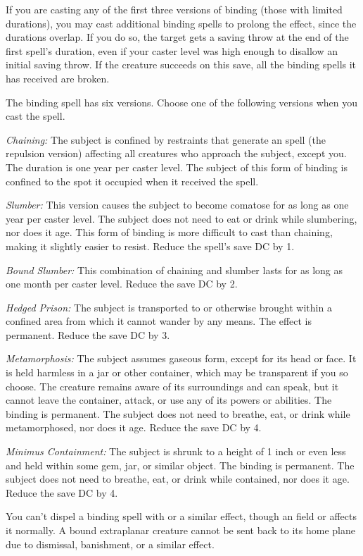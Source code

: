 If you are casting any of the first three versions of binding (those with limited durations), 
you may cast additional binding spells to prolong the effect, since the durations overlap. 
If you do so, the target gets a saving throw at the end of the first spell's duration, 
even if your caster level was high enough to disallow an initial saving throw. 
If the creature succeeds on this save, all the binding spells it has received are broken.

The binding spell has six versions. Choose one of the following versions when you cast the spell.
\begin{list}{}{\leftmargin=1em}
 \item \emph{Chaining:}
The subject is confined by restraints that generate an  spell (the repulsion version) affecting all creatures who approach the subject, except you. 
The duration is one year per caster level. 
The subject of this form of binding is confined to the spot it occupied when it received the spell.
\item \emph{Slumber:}
This version causes the subject to become comatose for as long as one year per caster level. 
The subject does not need to eat or drink while slumbering, nor does it age. 
This form of binding is more difficult to cast than chaining, making it slightly easier to resist. Reduce the spell's save DC by 1.
 \item \emph{Bound Slumber:}
This combination of chaining and slumber lasts for as long as one month per caster level. Reduce the save DC by 2.
 \item \emph{Hedged Prison:}
The subject is transported to or otherwise brought within a confined area from which it cannot wander by any means. 
The effect is permanent. Reduce the save DC by 3.
 \item \emph{Metamorphosis:}
The subject assumes gaseous form, except for its head or face. 
It is held harmless in a jar or other container, which may be transparent if you so choose. 
The creature remains aware of its surroundings and can speak, but it cannot leave the container, attack, or use any of its powers or abilities. 
The binding is permanent. 
The subject does not need to breathe, eat, or drink while metamorphosed, nor does it age. Reduce the save DC by 4.
 \item \emph{Minimus Containment:}
The subject is shrunk to a height of 1 inch or even less and held within some gem, jar, or similar object. 
The binding is permanent. The subject does not need to breathe, eat, or drink while contained, nor does it age. Reduce the save DC by 4.
\end{list}
You can't dispel a binding spell with  or a similar effect, 
though an  field or  affects it normally. 
A bound extraplanar creature cannot be sent back to its home plane due to dismissal, banishment, or a similar effect.

